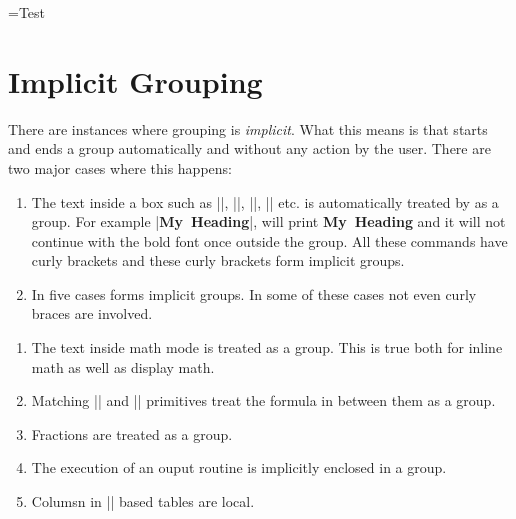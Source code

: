 \newbox\MyBox

\setbox\MyBox=\hbox{\hfil Test\hfill}

\unhbox\MyBox


\noindent\unhbox\MyBox






\section{Implicit Grouping}

There are  instances where grouping is \textit{implicit}. What this means is that \text starts and ends a group automatically and without any action by the user. There are two major cases where this happens:

\begin{enumerate}
\item The text inside a box such as |\hbox|, |\vbox|, |\vtop|, |\vcenter| etc. is automatically treated by \tex as a group.  For example |\hbox{\bf My Heading}|, will print  \hbox{\bf My Heading}  and it will not continue with the bold font once outside the group. All these commands have curly brackets and these curly brackets form implicit groups.
\item In five cases \tex forms implicit groups. In some of these cases not even curly braces are involved.
\end{enumerate}

\begin{enumerate}
\item The text inside math mode is treated as a group. This is true both for inline math as well as display math.
\item Matching |\left| and |\right| primitives treat the formula in between them as a group.
\item Fractions are treated as a group.
\item The execution of an ouput routine is implicitly enclosed in a group.
\item Columsn in |\halign| based tables are local.
\end{enumerate} 

